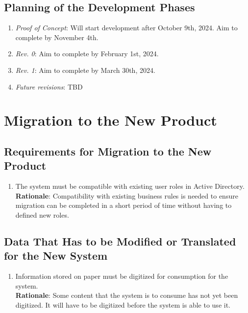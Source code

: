 \documentclass[12pt]{article}
\begin{document}
\subsection{Planning of the Development Phases}
\begin{enumerate}
  \item \textit{Proof of Concept}: Will start development after
    October 9th, 2024. Aim to complete by November 4th.
  \item \textit{Rev. 0}: Aim to complete by February 1st, 2024.
  \item \textit{Rev. 1}: Aim to complete by March 30th, 2024.
  \item \textit{Future revisions}: TBD
\end{enumerate}

\section{Migration to the New Product}
\subsection{Requirements for Migration to the New Product}
\begin{enumerate} [{MI-NP}1.]
  \item The system must be compatible with existing user roles in Active
    Directory.\\
    \textbf{Rationale}: Compatibility with existing business rules is needed
    to ensure migration can be completed in a short period of time without
    having to defined new roles.
\end{enumerate}

\subsection{Data That Has to be Modified or Translated for the New System}
\begin{enumerate} [{MI-TR}1.]
  \item Information stored on paper must be digitized for consumption for the
    system.\\
    \textbf{Rationale}: Some content that the system is to consume has not yet
    been digitized. It will have to be digitized before the system is able to
    use it.
\end{enumerate}

\newpage{}
\end{document}
